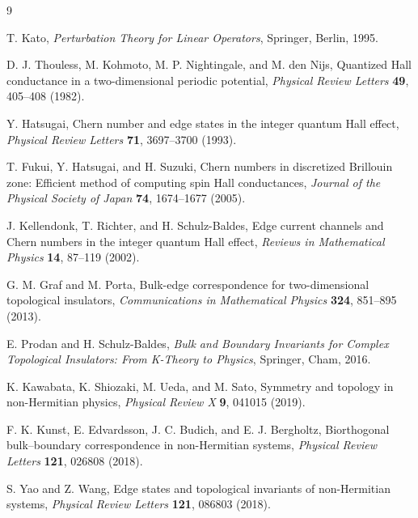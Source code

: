 \documentclass[11pt]{article}
\numberwithin{equation}{section}
\begin{document}
\begin{thebibliography}{9}

T. Kato,
\textit{Perturbation Theory for Linear Operators},
Springer, Berlin, 1995.

D. J. Thouless, M. Kohmoto, M. P. Nightingale, and M. den Nijs,
Quantized Hall conductance in a two-dimensional periodic potential,
\textit{Physical Review Letters} \textbf{49}, 405--408 (1982).

Y. Hatsugai,
Chern number and edge states in the integer quantum Hall effect,
\textit{Physical Review Letters} \textbf{71}, 3697--3700 (1993).

T. Fukui, Y. Hatsugai, and H. Suzuki,
Chern numbers in discretized Brillouin zone: Efficient method of
computing spin Hall conductances,
\textit{Journal of the Physical Society of Japan} \textbf{74}, 1674--1677
(2005).

J. Kellendonk, T. Richter, and H. Schulz-Baldes,
Edge current channels and Chern numbers in the integer quantum Hall
effect,
\textit{Reviews in Mathematical Physics} \textbf{14}, 87--119 (2002).

G. M. Graf and M. Porta,
Bulk-edge correspondence for two-dimensional topological insulators,
\textit{Communications in Mathematical Physics} \textbf{324}, 851--895
(2013).

E. Prodan and H. Schulz-Baldes,
\textit{Bulk and Boundary Invariants for Complex Topological Insulators:
From K-Theory to Physics},
Springer, Cham, 2016.

K. Kawabata, K. Shiozaki, M. Ueda, and M. Sato,
Symmetry and topology in non-Hermitian physics,
\textit{Physical Review X} \textbf{9}, 041015 (2019).

F. K. Kunst, E. Edvardsson, J. C. Budich, and E. J. Bergholtz,
Biorthogonal bulk--boundary correspondence in non-Hermitian systems,
\textit{Physical Review Letters} \textbf{121}, 026808 (2018).

S. Yao and Z. Wang,
Edge states and topological invariants of non-Hermitian systems,
\textit{Physical Review Letters} \textbf{121}, 086803 (2018).

\end{thebibliography}
\end{document}
